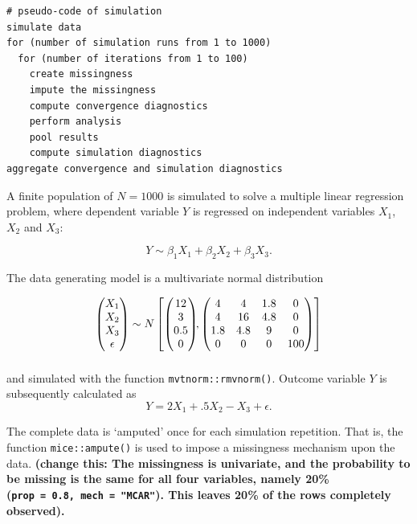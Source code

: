 \documentclass[Royal,times,sageh]{sagej}
\begin{document}
\begin{verbatim}
# pseudo-code of simulation 
simulate data 
for (number of simulation runs from 1 to 1000)
  for (number of iterations from 1 to 100)
    create missingness
    impute the missingness
    compute convergence diagnostics
    perform analysis
    pool results
    compute simulation diagnostics
aggregate convergence and simulation diagnostics
\end{verbatim}

A finite population of \(N=1000\) is simulated to solve a multiple
linear regression problem, where dependent variable \(Y\) is regressed
on independent variables \(X_1\), \(X_2\) and \(X_3\):

\[Y \sim \beta_1 X_1 + \beta_2 X_2 + \beta_3 X_3.\]

The data generating model is a multivariate normal distribution

\begin{align*}
\begin{pmatrix}X_1\\
X_2\\
X_3\\
\epsilon
\end{pmatrix} \sim  N
\begin{bmatrix}
\begin{pmatrix}
12\\
3\\
0.5\\
0
\end{pmatrix}\!\!,
\begin{pmatrix}
4 & 4 & 1.8 & 0\\
4 & 16 & 4.8 & 0\\
1.8 & 4.8 & 9 & 0\\
0 & 0 & 0 & 100
\end{pmatrix}
\end{bmatrix}\\[2\jot]
\end{align*}

and simulated with the function \texttt{mvtnorm::rmvnorm()}. Outcome
variable \(Y\) is subsequently calculated as
\[Y =  2X_1 + .5X_2 - X_3 + \epsilon .\]

The complete data is `amputed' once for each simulation repetition. That
is, the function \texttt{mice::ampute()} is used to impose a missingness
mechanism upon the data. \textbf{(change this: The missingness is
univariate, and the probability to be missing is the same for all four
variables, namely 20\% (\texttt{prop\ =\ 0.8,\ mech\ =\ "MCAR"}). This
leaves 20\% of the rows completely observed). }
\end{document}

